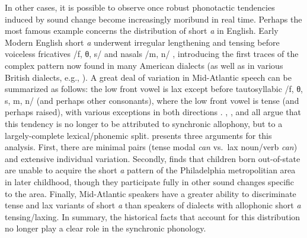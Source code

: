 In other cases, it is possible to observe once robust phonotactic tendencies induced by sound change become increasingly moribund in real time.
Perhaps the most famous example concerns the distribution of short \emph{a} in English.
Early Modern English short \emph{a} underwent irregular lengthening and tensing before voiceless fricatives /f, θ, s/ and nasals /m, n/ \citep[I.203f.]{AOE}, introducing the first traces of the complex pattern now found in many American dialects (as well as in various British dialects, e.g., \citealp[74f.]{Jones1964}).
A great deal of variation in Mid-Atlantic speech can be summarized as follows: the low front vowel is lax except before tautosyllabic /f, θ, s, m, n/ (and perhaps other consonants), where the low front vowel is tense (and perhaps raised), with various exceptions in both directions \citep[e.g.,][]{Cohen1970,Ferguson1975,Labov1981,Trager1930,Trager1934,Trager1940}.
\citet{Cohen1970}, \citet{Labov1981}, and \citet{Trager1940} all argue that this tendency is no longer to be attributed to synchronic allophony, but to a largely-complete lexical/phonemic split.
\citeauthor{Labov1981} presents three arguments for this analysis.
First, there are minimal pairs (tense modal \emph{can} vs.~lax noun/verb \emph{can}) and extensive individual variation.
Secondly, \citet{Payne1980} finds that children born out-of-state are unable to acquire the short \emph{a} pattern of the Philadelphia metropolitian area in later childhood, though they participate fully in other sound changes specific to the area.
Finally, Mid-Atlantic speakers have a greater ability to discriminate tense and lax variants of short \emph{a} than speakers of dialects with allophonic short \emph{a} tensing/laxing.
In summary, the historical facts that account for this distribution no longer play a clear role in the synchronic phonology.

